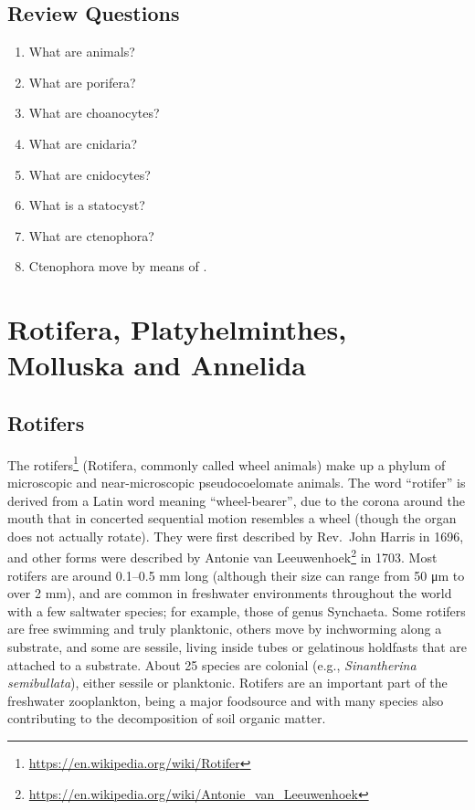 \documentclass[]{book}
\providecommand{\tightlist}{%
  \setlength{\itemsep}{0pt}\setlength{\parskip}{0pt}}
\let\rmarkdownfootnote\footnote%
\def\footnote{\protect\rmarkdownfootnote}
\renewcommand{\href}[2]{#2\footnote{\url{#1}}}
\theoremstyle{definition}
\theoremstyle{definition}
\theoremstyle{definition}
\theoremstyle{remark}
\begin{document}
\section{Review Questions}\label{review-questions-3}

\begin{enumerate}
\def\labelenumi{\arabic{enumi}.}
\tightlist
\item
  What are animals?
\item
  What are porifera?
\item
  What are choanocytes?
\item
  What are cnidaria?
\item
  What are cnidocytes?
\item
  What is a statocyst?
\item
  What are ctenophora?
\item
  Ctenophora move by means of \underline{\phantom{answer}}.
\end{enumerate}

\chapter{Rotifera, Platyhelminthes, Molluska and
Annelida}\label{rotifera-platyhelminthes-molluska-and-annelida}

\section{Rotifers}\label{rotifers}

The \href{https://en.wikipedia.org/wiki/Rotifer}{rotifers} (Rotifera,
commonly called wheel animals) make up a phylum of microscopic and
near-microscopic pseudocoelomate animals. The word ``rotifer'' is
derived from a Latin word meaning ``wheel-bearer'', due to the corona
around the mouth that in concerted sequential motion resembles a wheel
(though the organ does not actually rotate). They were first described
by Rev.~John Harris in 1696, and other forms were described by \href{https://en.wikipedia.org/wiki/Antonie_van_Leeuwenhoek}{Antonie
van Leeuwenhoek} in 1703. Most rotifers are around 0.1--0.5 mm long
(although their size can range from 50 μm to over 2 mm), and are common
in freshwater environments throughout the world with a few saltwater
species; for example, those of genus Synchaeta. Some rotifers are free
swimming and truly planktonic, others move by inchworming along a
substrate, and some are sessile, living inside tubes or gelatinous
holdfasts that are attached to a substrate. About 25 species are
colonial (e.g., \emph{Sinantherina semibullata}), either sessile or planktonic.
Rotifers are an important part of the freshwater zooplankton, being a
major foodsource and with many species also contributing to the
decomposition of soil organic matter.
\end{document}
